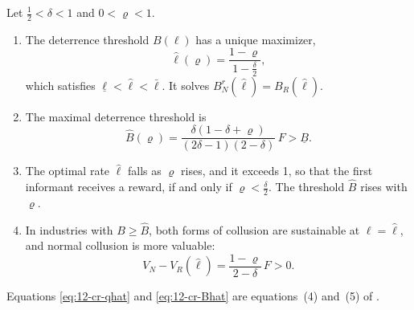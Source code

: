 \begin{proposition}\label{prop:12-chen-rey}
Let $\frac{1}{2} < \delta < 1$ and $0 < \varrho < 1$.
\begin{enumerate}[label=(\alph*)]
\item The deterrence threshold $B(\ell)$ has a unique maximizer,
\begin{equation}\label{eq:12-cr-qhat}
\hat\ell(\varrho) = \frac{1 - \varrho}{1 - \frac{\delta}{2}},
\end{equation}
which satisfies $\underline\ell < \hat\ell < \bar\ell$. It solves $B_N^r(\hat\ell) = B_R(\hat\ell)$.
\item The maximal deterrence threshold is
\begin{equation}\label{eq:12-cr-Bhat}
\hat B(\varrho) = \frac{\delta(1 - \delta + \varrho)}{(2\delta - 1)(2 - \delta)}\,F > \underline B.
\end{equation}
\item The optimal rate $\hat\ell$ falls as $\varrho$ rises, and it exceeds 1, so that the first informant receives a
reward, if and only if $\varrho < \frac{\delta}{2}$. The threshold $\hat B$ rises with $\varrho$.
\item In industries with $B \ge \hat B$, both forms of collusion are sustainable at $\ell = \hat\ell$, and normal
collusion is more valuable:
\begin{equation}\label{eq:12-cr-VN-VR}
V_N - V_R(\hat\ell) = \frac{1 - \varrho}{2 - \delta}\,F > 0.
\end{equation}
\end{enumerate}
Equations \eqref{eq:12-cr-qhat} and \eqref{eq:12-cr-Bhat} are equations~(4) and~(5) of \citet{ChenRey2013}.
\end{proposition}

